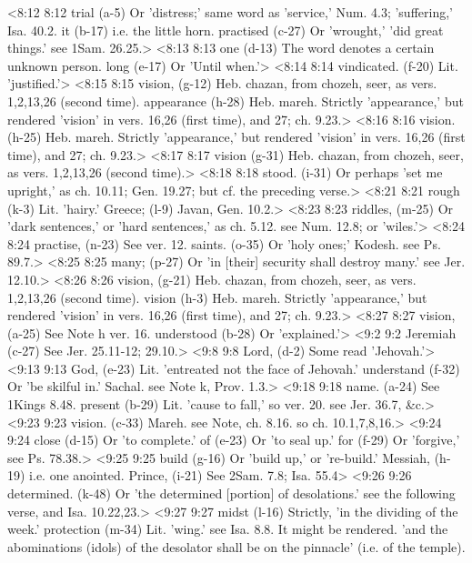 <8:12 8:12  trial (a-5)  Or 'distress;' same word as 'service,' Num. 4.3; 'suffering,'  Isa. 40.2.
  it (b-17)  i.e. the little horn.
  practised (c-27)  Or 'wrought,' 'did great things.' see 1Sam. 26.25.>
<8:13 8:13  one (d-13)  The word denotes a certain unknown person.
  long (e-17)  Or 'Until when.'>
<8:14 8:14  vindicated. (f-20)  Lit. 'justified.'>
<8:15 8:15  vision, (g-12) Heb. chazan, from chozeh, seer, as vers. 1,2,13,26  (second time).
  appearance (h-28)  Heb. mareh. Strictly 'appearance,' but rendered 'vision' in  vers. 16,26 (first time), and 27; ch. 9.23.>
<8:16 8:16  vision. (h-25)  Heb. mareh. Strictly 'appearance,' but rendered 'vision' in  vers. 16,26 (first time), and 27; ch. 9.23.>
<8:17 8:17  vision (g-31) Heb. chazan, from chozeh, seer, as vers. 1,2,13,26  (second time).>
<8:18 8:18  stood. (i-31)  Or perhaps 'set me upright,' as ch. 10.11; Gen. 19.27; but  cf. the preceding verse.>
<8:21 8:21  rough (k-3)  Lit. 'hairy.'
  Greece; (l-9)  Javan, Gen. 10.2.>
<8:23 8:23  riddles, (m-25)  Or 'dark sentences,' or 'hard sentences,' as ch. 5.12. see  Num. 12.8; or 'wiles.'>
<8:24 8:24  practise, (n-23)  See ver. 12.
  saints. (o-35)  Or 'holy ones;' Kodesh. see Ps. 89.7.>
<8:25 8:25  many; (p-27)  Or 'in [their] security shall destroy many.' see Jer. 12.10.>
<8:26 8:26  vision, (g-21)  Heb. chazan, from chozeh, seer, as vers. 1,2,13,26  (second time).
  vision (h-3)  Heb. mareh. Strictly 'appearance,' but rendered 'vision' in  vers. 16,26 (first time), and 27; ch. 9.23.>
<8:27 8:27  vision, (a-25)  See Note h ver. 16.
  understood (b-28)  Or 'explained.'>
<9:2 9:2  Jeremiah (c-27)  See Jer. 25.11-12; 29.10.>
<9:8 9:8  Lord, (d-2)  Some read 'Jehovah.'>
<9:13 9:13  God, (e-23)  Lit. 'entreated not the face of Jehovah.'
  understand (f-32)  Or 'be skilful in.' Sachal. see Note k, Prov. 1.3.>
<9:18 9:18  name. (a-24)  See 1Kings 8.48.
  present (b-29)  Lit. 'cause to fall,' so ver. 20. see Jer. 36.7, &c.>
<9:23 9:23  vision. (c-33)  Mareh. see Note, ch. 8.16. so ch. 10.1,7,8,16.>
<9:24 9:24  close (d-15)  Or 'to complete.'
  of (e-23)  Or 'to seal up.'
  for (f-29)  Or 'forgive,' see Ps. 78.38.>
<9:25 9:25  build (g-16)  Or 'build up,' or 're-build.'
  Messiah, (h-19)  i.e. one anointed.
  Prince, (i-21)  See 2Sam. 7.8; Isa. 55.4>
<9:26 9:26  determined. (k-48)  Or 'the determined [portion] of desolations.' see the  following verse, and Isa. 10.22,23.>
<9:27 9:27  midst (l-16)  Strictly, 'in the dividing of the week.'
  protection (m-34)  Lit. 'wing.' see Isa. 8.8. It might be rendered. 'and the  abominations (idols) of the desolator shall be on the pinnacle'  (i.e. of the temple).
